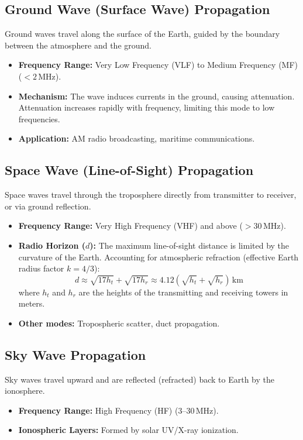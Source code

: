 \documentclass[12pt,a4paper]{article}
\begin{document}
\subsection{Ground Wave (Surface Wave) Propagation}
Ground waves travel along the surface of the Earth, guided by the boundary between the atmosphere and the ground.
\begin{itemize}[leftmargin=*, itemsep=2pt]
  \item \textbf{Frequency Range:} Very Low Frequency (VLF) to Medium Frequency (MF) ($< 2\,\text{MHz}$).
  \item \textbf{Mechanism:} The wave induces currents in the ground, causing attenuation. Attenuation increases rapidly with frequency, limiting this mode to low frequencies.
  \item \textbf{Application:} AM radio broadcasting, maritime communications.
\end{itemize}

\subsection{Space Wave (Line-of-Sight) Propagation}
Space waves travel through the troposphere directly from transmitter to receiver, or via ground reflection.
\begin{itemize}[leftmargin=*, itemsep=2pt]
  \item \textbf{Frequency Range:} Very High Frequency (VHF) and above ($> 30\,\text{MHz}$).
  \item \textbf{Radio Horizon ($d$):} The maximum line-of-sight distance is limited by the curvature of the Earth. Accounting for atmospheric refraction (effective Earth radius factor $k = 4/3$):
  \[
  d \approx \sqrt{17 h_t} + \sqrt{17 h_r} \approx 4.12 \left( \sqrt{h_t} + \sqrt{h_r} \right) \,\text{km}
  \]
  where $h_t$ and $h_r$ are the heights of the transmitting and receiving towers in meters.
  \item \textbf{Other modes:} Tropospheric scatter, duct propagation.
\end{itemize}

\subsection{Sky Wave Propagation}
Sky waves travel upward and are reflected (refracted) back to Earth by the ionosphere.
\begin{itemize}[leftmargin=*, itemsep=2pt]
  \item \textbf{Frequency Range:} High Frequency (HF) ($3$–$30\,\text{MHz}$).
  \item \textbf{Ionospheric Layers:} Formed by solar UV/X-ray ionization.
\end{itemize}
\end{document}
